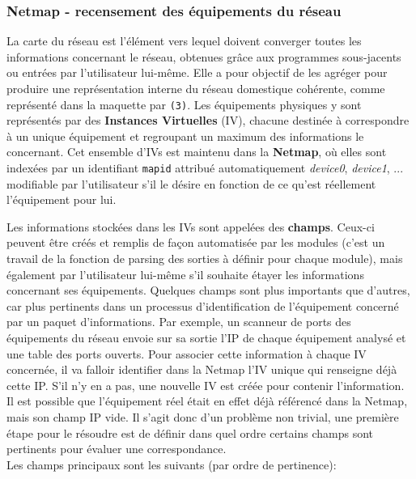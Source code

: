 \documentclass[]{article}
\begin{document}
\newpage

\subsubsection{Netmap - recensement des équipements du réseau}

La carte du réseau est l'élément vers lequel doivent converger toutes les informations concernant le réseau, obtenues grâce aux programmes sous-jacents ou entrées par l'utilisateur lui-même. Elle a pour objectif de les agréger pour produire une représentation interne du réseau domestique cohérente, comme représenté dans la maquette par \texttt{(3)}. Les équipements physiques y sont représentés par des \textbf{Instances Virtuelles} (IV), chacune destinée à correspondre à un unique équipement et regroupant un maximum des informations le concernant. Cet ensemble d'IVs est maintenu dans la \textbf{Netmap}, où elles sont indexées par un identifiant \texttt{mapid} attribué automatiquement \textit{device0}, \textit{device1}, ... modifiable par l'utilisateur s'il le désire en fonction de ce qu'est réellement l'équipement pour lui.\\

\par Les informations stockées dans les IVs sont appelées des \textbf{champs}. Ceux-ci peuvent être créés et remplis de façon automatisée par les modules (c'est un travail de la fonction de parsing des sorties à définir pour chaque module), mais également par l'utilisateur lui-même s'il souhaite étayer les informations concernant ses équipements. Quelques champs sont plus importants que d'autres, car plus pertinents dans un processus d'identification de l'équipement concerné par un paquet d'informations. Par exemple, un scanneur de ports des équipements du réseau envoie sur sa sortie l'IP de chaque équipement analysé et une table des ports ouverts. Pour associer cette information à chaque IV concernée, il va falloir identifier dans la Netmap l'IV unique qui renseigne déjà cette IP. S'il n'y en a pas, une nouvelle IV est créée pour contenir l'information. Il est possible que l'équipement réel était en effet déjà référencé dans la Netmap, mais son champ IP vide. Il s'agit donc d'un problème non trivial, une première étape pour le résoudre est de définir dans quel ordre certains champs sont pertinents pour évaluer une correspondance.\\

Les champs principaux sont les suivants (par ordre de pertinence):
\end{document}
